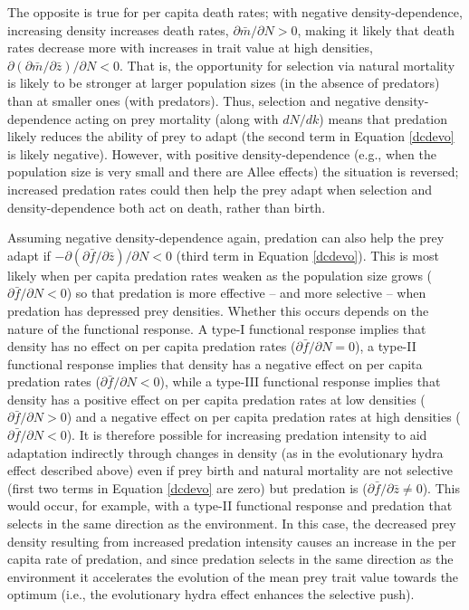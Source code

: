 \documentclass[11pt]{article}
\begin{document}
The opposite is true for per capita death rates; with negative density-dependence, increasing density increases death rates, $\partial \bar{m}/\partial N > 0$, making it likely that death rates decrease more with increases in trait value at high densities, $\partial (\partial \bar{m}/\partial \bar{z}) /\partial N < 0$.
That is, the opportunity for selection via natural mortality is likely to be stronger at larger population sizes (in the absence of predators) than at smaller ones (with predators).
Thus, selection and negative density-dependence acting on prey mortality (along with $dN/dk$) means that predation likely reduces the ability of prey to adapt (the second term in Equation \ref{dcdevo} is likely negative). 
However, with positive density-dependence (e.g., when the population size is very small and there are Allee effects) the situation is reversed; increased predation rates could then help the prey adapt when selection and density-dependence both act on death, rather than birth.

Assuming negative density-dependence again, predation can also help the prey adapt if $-\partial (\partial\bar{f}/\partial\bar{z}) / \partial N < 0$ (third term in Equation \ref{dcdevo}).
This is most likely when per capita predation rates weaken as the population size grows ($\partial \bar{f}/\partial N<0$) so that predation is more effective -- and more selective -- when predation has depressed prey densities.
Whether this occurs depends on the nature of the functional response.
A type-I functional response implies that density has no effect on per capita predation rates ($\partial \bar{f}/\partial N = 0$), a type-II functional response implies that density has a negative effect on per capita predation rates ($\partial \bar{f}/\partial N < 0$), while a type-III functional response implies that density has a positive effect on per capita predation rates at low densities ($\partial \bar{f} /\partial N > 0$) and a negative effect on per capita predation rates at high densities ($\partial \bar{f} / \partial N < 0$).
It is therefore possible for increasing predation intensity to aid adaptation indirectly through changes in density (as in the evolutionary hydra effect described above) even if prey birth and natural mortality are not selective (first two terms in Equation \ref{dcdevo} are zero) but predation is ($\partial \bar{f}/\partial \bar{z}\neq0$).
This would occur, for example, with a type-II functional response and predation that selects in the same direction as the environment.
In this case, the decreased prey density resulting from increased predation intensity causes an increase in the per capita rate of predation, and since predation selects in the same direction as the environment it accelerates the evolution of the mean prey trait value towards the optimum (i.e., the evolutionary hydra effect enhances the selective push).
\end{document}
